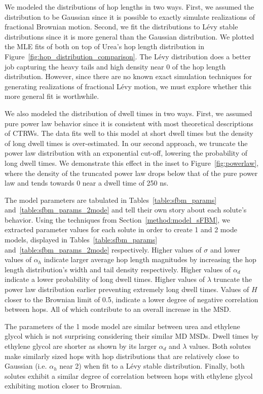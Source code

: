 \documentclass{article}
\begin{document}
  We modeled the distributions of hop lengths in two ways. First, we assumed the 
  distribution to be Gaussian since it is possible to exactly simulate realizations of
  fractional Brownian motion. Second, we fit the distributions to L\'evy stable 
  distributions since it is more general than the Gaussian distribution. We plotted
  the MLE fits of both on top of Urea's hop length distribution in 
  Figure~\ref{fig:hop_distribution_comparison}. The L\'evy distribution does a better
  job capturing the heavy tails and high density near 0 of the hop length distribution.
  However, since there are no known exact simulation techniques for generating 
  realizations of fractional L\'evy motion, we must explore whether this more general
  fit is worthwhile. 
  
  We also modeled the distribution of dwell times in two ways. First, we assumed pure
  power law behavior since it is consistent with most theoretical descriptions of CTRWs.
  The data fits well to this model at short dwell times but
  the density of long dwell times is over-estimated. In our second approach, we truncate
  the power law distribution with an exponential cut-off, lowering the probability of
  long dwell times. We demonstrate this effect in the inset to Figure~\ref{fig:powerlaw}, where the
  density of the truncated power law drops below that of the pure power law and tends towards
  0 near a dwell time of 250 ns.
  
  The model parameters are tabulated in Tables~\ref{table:sfbm_params} 
  and~\ref{table:sfbm_params_2mode} and tell their own story about each solute's behavior. Using the 
  techniques from Section~\ref{method:model_sFBM}, we extracted parameter values for each
  solute in order to create 1 and 2 mode models, displayed in Tables~\ref{table:sfbm_params} 
  and~\ref{table:sfbm_params_2mode} respectively. Higher values of $\sigma$ and lower
  values of $\alpha_h$ indicate larger average hop length magnitudes by increasing the
  hop length distribution's width and tail density respectively. Higher values of $\alpha_d$
  indicate a lower probability of long dwell times. Higher values of $\lambda$ truncate
  the power law distribution earlier preventing extremely long dwell times. Values of $H$
  closer to the Brownian limit of 0.5, indicate a lower degree of negative correlation 
  between hops. All of which contribute to an overall increase in the MSD.
  
  The parameters of the 1 mode model are similar between urea and ethylene glycol which 
  is not surprising considering their similar MD MSDs. Dwell times by 
  ethylene glycol are shorter as shown by its larger $\alpha_d$ and $\lambda$ values. Both
  solutes make similarly sized hops with hop distributions that are relatively close 
  to Gaussian (i.e. $\alpha_h$ near 2) when fit to a L\'evy stable distribution. Finally,
  both solutes exhibit a similar degree of correlation between hops with ethylene glycol
  exhibiting motion closer to Brownian. 
  
\end{document}
